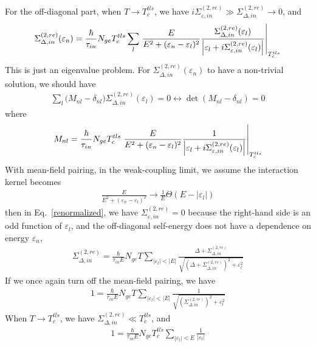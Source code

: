 \documentclass[]{article}
\begin{document}
For the off-diagonal part, when $T \rightarrow T_c^{tls}$,
we have $i\Sigma_{\varepsilon,in}^{(2,re)} \gg \Sigma_{\Delta,in}^{(2,re)} \rightarrow 0$, and
\begin{align}
    \Sigma_{\Delta,in}^{(2,re)}(\varepsilon_n)
    = \frac{\hbar}{\tau_{in}}N_{ge}T_c^{tls}\sum_l\eval{\frac{E}{E^2+(\varepsilon_n-\varepsilon_l)^2}
    \frac{\Sigma_{\Delta,in}^{(2,re)}(\varepsilon_l)}
    {\left|\varepsilon_l + i\Sigma_{\varepsilon,in}^{(2,re)}(\varepsilon_l)\right|}}_{T_c^{tls}} \label{eq:off-diagonal}
\end{align}
This is just an eigenvalue problem. For $\Sigma_{\Delta,in}^{(2,re)}(\varepsilon_n)$ to have a non-trivial solution,
we should have
\begin{align}
    \sum_l \bigg(M_{nl} - \delta_{nl}\bigg) \Sigma_{\Delta,in}^{(2,re)}(\varepsilon_l) = 0
    \leftrightarrow
    \det(M_{nl} - \delta_{nl}) = 0
\end{align}
where
\begin{align}
    M_{nl} = 
    \frac{\hbar}{\tau_{in}}N_{ge}T_c^{tls}\eval{\frac{E}{E^2+(\varepsilon_n-\varepsilon_l)^2}
    \frac{1}{\left|\varepsilon_l + i\Sigma_{\varepsilon,in}^{(2,re)}(\varepsilon_l)\right|}}_{T_c^{tls}}
\end{align}
With mean-field pairing,
in the weak-coupling limit, we assume the interaction kernel becomes
\begin{align}
    \frac{E}{E^2+(\varepsilon_n-\varepsilon_l)^2} \rightarrow
    \frac{1}{E}\Theta(E-|\varepsilon_l|)
\end{align}
then in Eq.~\eqref{renormalized}, we have $\Sigma_{\varepsilon,in}^{(2,re)} = 0$ because the
right-hand side is an odd function of $\varepsilon_l$, and the off-diagonal self-energy
does not have a dependence on energy $\varepsilon_n$,
\begin{align}
    \Sigma_{\Delta,in}^{(2,re)} = \frac{\hbar}{\tau_{in}E}N_{ge}T\sum_{|\varepsilon_l| < |E|}
    \frac{\Delta + \Sigma_{\Delta,in}^{(2,re)}}
    {\sqrt{\left(\Delta + \Sigma_{\Delta,in}^{(2,re)}\right)^2 + \varepsilon_l^2 }}
\end{align}
If we once again turn off the mean-field pairing, we have
\begin{align}
    1 = \frac{\hbar}{\tau_{in}E}N_{ge}T\sum_{|\varepsilon_l| < |E|}
    \frac{1}{\sqrt{\left(\Sigma_{\Delta,in}^{(2,re)}\right)^2 + \varepsilon_l^2 }}
\end{align}
When $T \rightarrow T_c^{tls}$, we have $\Sigma_{\Delta,in}^{(2,re)} \ll T_c^{tls}$, and
\begin{align}
    1 = \frac{\hbar}{\tau_{in}E}N_{ge}T_c^{tls}\sum_{|\varepsilon_l| < E}
    \frac{1}{|\varepsilon_l|}
\end{align}
\end{document}
